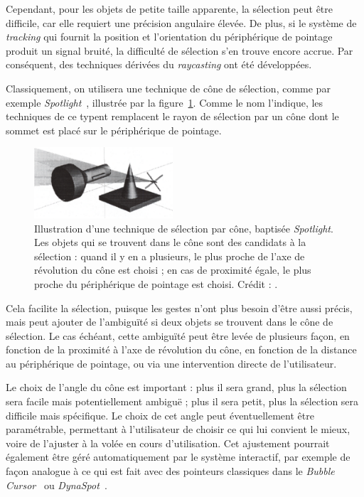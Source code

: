 	Cependant, pour les objets de petite taille apparente, la sélection peut être difficile, car elle requiert une précision angulaire élevée. De plus, si le système de \emph{tracking} qui fournit la position et l'orientation du périphérique de pointage produit un signal bruité, la difficulté de sélection s'en trouve encore accrue. Par conséquent, des techniques dérivées du \emph{raycasting} ont été développées.
	
	Classiquement, on utilisera une technique de cône de sélection, comme par exemple \emph{Spotlight}~\cite{liang1994jdcad}, illustrée par la figure~\ref{fig:spotlight}. Comme le nom l'indique, les techniques de ce typent remplacent le rayon de sélection par un cône dont le sommet est placé sur le périphérique de pointage.
	
	\begin{figure} %
		\centering
		\includegraphics[width=0.46\textwidth]{figures/ch2/spotlight}
		\caption[Cône de sélection : \emph{Spotlight}]{Illustration d'une technique de sélection par cône, baptisée \emph{Spotlight}. Les objets qui se trouvent dans le cône sont des candidats à la sélection : quand il y en a plusieurs, le plus proche de l'axe de révolution du cône est choisi ; en cas de proximité égale, le plus proche du périphérique de pointage est choisi. Crédit : \cite{liang1994jdcad}.}
		\label{fig:spotlight}
	\end{figure}
	
	Cela facilite la sélection, puisque les gestes n'ont plus besoin d'être aussi précis, mais peut ajouter de l'ambiguïté si deux objets se trouvent dans le cône de sélection. Le cas échéant, cette ambiguïté peut être levée de plusieurs façon, en fonction de la proximité à l'axe de révolution du cône, en fonction de la distance au périphérique de pointage, ou via une intervention directe de l'utilisateur.
	
	Le choix de l'angle du cône est important : plus il sera grand, plus la sélection sera facile mais potentiellement ambiguë ; plus il sera petit, plus la sélection sera difficile mais spécifique. Le choix de cet angle peut éventuellement être paramétrable, permettant à l'utilisateur de choisir ce qui lui convient le mieux, voire de l'ajuster à la volée en cours d'utilisation. Cet ajustement pourrait également être géré automatiquement par le système interactif, par exemple de façon analogue à ce qui est fait avec des pointeurs classiques dans le \emph{Bubble Cursor}~\cite{grossman2005bubble} ou \emph{DynaSpot}~\cite{chapuis2009dynaspot}.
	
